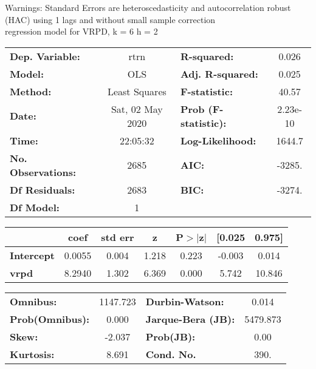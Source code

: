 Warnings: \newline
 [1] Standard Errors are heteroscedasticity and autocorrelation robust (HAC) using 1 lags and without small sample correction\\ 

regression model for VRPD, k = 6 h = 2\begin{center}
\begin{tabular}{lclc}
\toprule
\textbf{Dep. Variable:}    &       rtrn       & \textbf{  R-squared:         } &     0.026   \\
\textbf{Model:}            &       OLS        & \textbf{  Adj. R-squared:    } &     0.025   \\
\textbf{Method:}           &  Least Squares   & \textbf{  F-statistic:       } &     40.57   \\
\textbf{Date:}             & Sat, 02 May 2020 & \textbf{  Prob (F-statistic):} &  2.23e-10   \\
\textbf{Time:}             &     22:05:32     & \textbf{  Log-Likelihood:    } &    1644.7   \\
\textbf{No. Observations:} &        2685      & \textbf{  AIC:               } &    -3285.   \\
\textbf{Df Residuals:}     &        2683      & \textbf{  BIC:               } &    -3274.   \\
\textbf{Df Model:}         &           1      & \textbf{                     } &             \\
\bottomrule
\end{tabular}
\begin{tabular}{lcccccc}
                   & \textbf{coef} & \textbf{std err} & \textbf{z} & \textbf{P$> |$z$|$} & \textbf{[0.025} & \textbf{0.975]}  \\
\midrule
\textbf{Intercept} &       0.0055  &        0.004     &     1.218  &         0.223        &       -0.003    &        0.014     \\
\textbf{vrpd}      &       8.2940  &        1.302     &     6.369  &         0.000        &        5.742    &       10.846     \\
\bottomrule
\end{tabular}
\begin{tabular}{lclc}
\textbf{Omnibus:}       & 1147.723 & \textbf{  Durbin-Watson:     } &    0.014  \\
\textbf{Prob(Omnibus):} &   0.000  & \textbf{  Jarque-Bera (JB):  } & 5479.873  \\
\textbf{Skew:}          &  -2.037  & \textbf{  Prob(JB):          } &     0.00  \\
\textbf{Kurtosis:}      &   8.691  & \textbf{  Cond. No.          } &     390.  \\
\bottomrule
\end{tabular}
\end{center}

